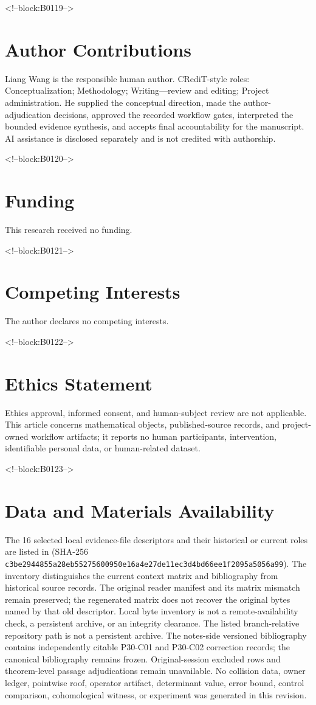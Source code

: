 \documentclass[11pt,a4paper]{article}
\begin{document}
<!--block:B0119-->
\section*{Author Contributions}
Liang Wang is the responsible human author. CRediT-style roles: Conceptualization; Methodology; Writing---review and editing; Project administration. He supplied the conceptual direction, made the author-adjudication decisions, approved the recorded workflow gates, interpreted the bounded evidence synthesis, and accepts final accountability for the manuscript. AI assistance is disclosed separately and is not credited with authorship.

<!--block:B0120-->
\section*{Funding}
This research received no funding.

<!--block:B0121-->
\section*{Competing Interests}
The author declares no competing interests.

<!--block:B0122-->
\section*{Ethics Statement}
Ethics approval, informed consent, and human-subject review are not applicable. This article concerns mathematical objects, published-source records, and project-owned workflow artifacts; it reports no human participants, intervention, identifiable personal data, or human-related dataset.

<!--block:B0123-->
\section*{Data and Materials Availability}
The 16 selected local evidence-file descriptors and their historical or current
roles are listed in
(SHA-256 \texttt{c3be2944855a28eb\allowbreak 55275600950e16a4\allowbreak e27de11ec3d4bd66\allowbreak ee1f2095a5056a99}).
The inventory distinguishes the current context matrix and bibliography from
historical source records. The original reader manifest and its
 matrix mismatch remain preserved; the regenerated matrix does
not recover the original bytes named by that old descriptor. Local byte
inventory is not a remote-availability check, a persistent archive, or an
integrity clearance. The listed branch-relative repository path is not a
persistent archive. The notes-side versioned bibliography contains independently
citable P30-C01 and P30-C02 correction records; the canonical bibliography remains
frozen. Original-session excluded rows and theorem-level passage adjudications
remain unavailable. No collision data, owner ledger, pointwise roof, operator
artifact, determinant value, error bound, control comparison, cohomological
witness, or experiment was generated in this revision.
\end{document}
